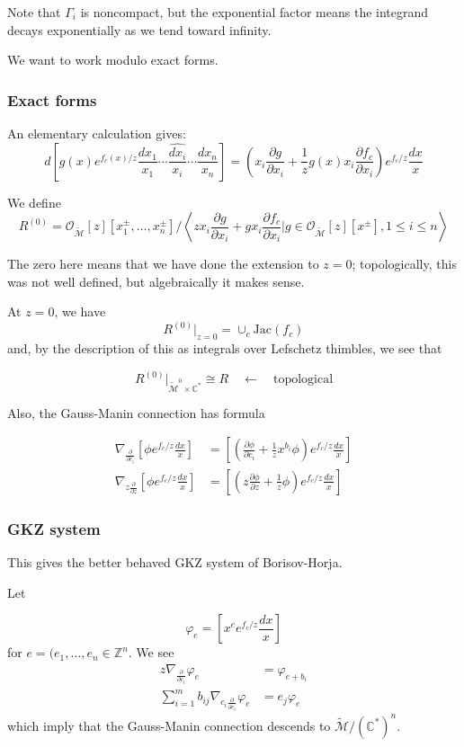 \documentclass{amsart}
\theoremstyle{definition}
\newcommand{\Z}{\mathbb{Z}}
\newcommand{\OO}{\mathcal{O}}
\newcommand{\M}{\mathcal{M}}
\newcommand{\C}{\mathbb{C}}
\begin{document}
Note that $\Gamma_i$ is noncompact, but the exponential factor means the integrand decays exponentially as we tend toward infinity.

We want to work modulo exact forms.

\subsubsection{Exact forms}
An elementary calculation gives:
$$d\left[g(x)e^{f_c(x)/z}\frac{dx_1}{x_1}\cdots\hat{\frac{dx_i}{x_i}}\cdots\frac{dx_n}{x_n}\right]
=\left(x_i\frac{\partial g}{\partial x_i}+\frac{1}{z} g(x) x_i\frac{\partial f_c}{\partial x_i}\right)e^{f_c/z}\frac{dx}{x}
$$

We define $$R^{(0)}=\OO_{\tilde{\M}}[z][x_1^\pm,\dots,x_n^\pm]\Big/ \left\langle 
zx_i\frac{\partial g}{\partial x_i}+g x_i\frac{\partial f_c}{\partial x_i} \Big| g\in\OO_{\tilde{\M}}[z][x^\pm], 1\leq i \leq n\right\rangle$$

The zero here means that we have done the extension to $z=0$; topologically, this was not well defined, but algebraically it makes sense.


At $z=0$, we have
$$R^{(0)}\big|_{z=0}=\cup_c \text{Jac}(f_c)$$
and, by the description of this as integrals over Lefschetz thimbles, we see that

$$R^{(0)}\big|_{\tilde{\M}^0\times\C^*}\cong R\quad\leftarrow\quad\text{topological}$$

Also, the Gauss-Manin connection has formula

\begin{align*}
\nabla_{\frac{\partial}{\partial c_i}}\left[\phi e^{f_c/z}\frac{dx}{x}\right]&=
\left[\left(\frac{\partial\phi}{\partial c_i}+\frac{1}{z}x^{b_i}\phi\right)e^{f_c/z}\frac{dx}{x}\right] \\
\nabla_{z\frac{\partial}{\partial z}}\left[\phi e^{f_c/z}\frac{dx}{x}\right]&=
\left[\left(z\frac{\partial\phi}{\partial z}+\frac{1}{z}\phi\right)e^{f_c/z}\frac{dx}{x}\right] 
\end{align*}

\subsubsection{GKZ system}
This gives the better behaved GKZ system of Borisov-Horja.

Let

$$\varphi_e=\left[x^e e^{f_c/z}\frac{dx}{x}\right]$$
for $e=(e_1,\dots, e_n\in\Z^n$.
We see
\begin{align*}
z\nabla_{\frac{\partial}{\partial c_i}}\varphi_e&=\varphi_{e+b_i} \\
\sum_{i=1}^m b_{ij}\nabla_{c_i\frac{\partial}{\partial c_i}}\varphi_e&=e_j\varphi_{e}
\end{align*}
which imply that the Gauss-Manin connection descends to $\tilde{\M}/(\C^*)^n$.
\end{document}
